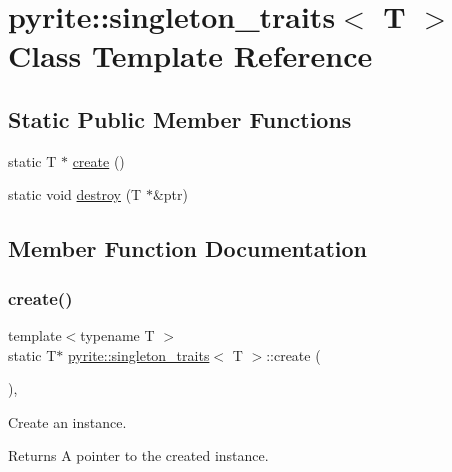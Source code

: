 \hypertarget{classpyrite_1_1singleton__traits}{}\section{pyrite\+:\+:singleton\+\_\+traits$<$ T $>$ Class Template Reference}
\label{classpyrite_1_1singleton__traits}
\subsection*{Static Public Member Functions}
\begin{DoxyCompactItemize}
\item 
static T $\ast$ \mbox{\hyperlink{classpyrite_1_1singleton__traits_a330f3723ce3b87978b6d45955be7950f}{create}} ()
\item 
static void \mbox{\hyperlink{classpyrite_1_1singleton__traits_a5ab8adb032a935f6e3a164bac97d2c93}{destroy}} (T $\ast$\&ptr)
\end{DoxyCompactItemize}


\subsection{Member Function Documentation}
\mbox{\label{classpyrite_1_1singleton__traits_a330f3723ce3b87978b6d45955be7950f}} 
\subsubsection{\texorpdfstring{create()}{create()}}
{\footnotesize\ttfamily template$<$typename T $>$ \\
static T$\ast$ \mbox{\hyperlink{classpyrite_1_1singleton__traits}{pyrite\+::singleton\+\_\+traits}}$<$ T $>$\+::create (\begin{DoxyParamCaption}{ }\end{DoxyParamCaption})\hspace{0.3cm}{\ttfamily [inline]}, {\ttfamily [static]}}

Create an instance. \begin{DoxyReturn}{Returns}
A pointer to the created instance. 
\end{DoxyReturn}
\mbox{\label{classpyrite_1_1singleton__traits_a5ab8adb032a935f6e3a164bac97d2c93}} 
